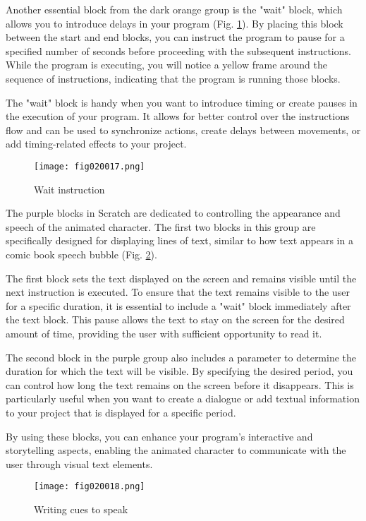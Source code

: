 Another essential block from the dark orange group is the "wait" block, which allows you to introduce delays in your program (Fig. \ref{fig020017}). By placing this block between the start and end blocks, you can instruct the program to pause for a specified number of seconds before proceeding with the subsequent instructions. While the program is executing, you will notice a yellow frame around the sequence of instructions, indicating that the program is running those blocks.

The "wait" block is handy when you want to introduce timing or create pauses in the execution of your program. It allows for better control over the instructions flow and can be used to synchronize actions, create delays between movements, or add timing-related effects to your project.

\begin{figure}[H]
   \centering
   \texttt{[image: fig020017.png]}
   \caption{Wait instruction}
\label{fig020017}
\end{figure}

The purple blocks in Scratch are dedicated to controlling the appearance and speech of the animated character. The first two blocks in this group are specifically designed for displaying lines of text, similar to how text appears in a comic book speech bubble (Fig. \ref{fig020018}).

The first block sets the text displayed on the screen and remains visible until the next instruction is executed. To ensure that the text remains visible to the user for a specific duration, it is essential to include a "wait" block immediately after the text block. This pause allows the text to stay on the screen for the desired amount of time, providing the user with sufficient opportunity to read it.

The second block in the purple group also includes a parameter to determine the duration for which the text will be visible. By specifying the desired period, you can control how long the text remains on the screen before it disappears. This is particularly useful when you want to create a dialogue or add textual information to your project that is displayed for a specific period.

By using these blocks, you can enhance your program's interactive and storytelling aspects, enabling the animated character to communicate with the user through visual text elements.

\begin{figure}[H]
   \centering
   \texttt{[image: fig020018.png]}
   \caption{Writing cues to speak}
\label{fig020018}
\end{figure}

